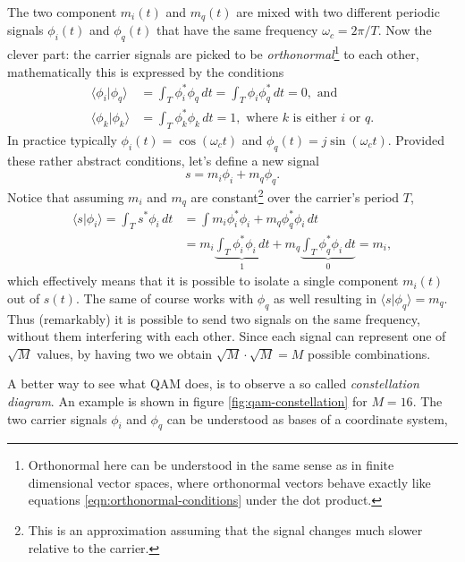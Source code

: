 The two component \(m_i(t)\) and \(m_q(t)\) are mixed with two different periodic signals \(\phi_i(t)\) and \(\phi_q(t)\) that have the same frequency \(\omega_c = 2\pi / T\). Now the clever part: the carrier signals are picked to be \emph{orthonormal}\footnote{Orthonormal here can be understood in the same sense as in finite dimensional vector spaces, where orthonormal vectors behave exactly like equations \eqref{eqn:orthonormal-conditions} under the dot product.} to each other, mathematically this is expressed by the conditions
\begin{subequations} \label{eqn:orthonormal-conditions}
	\begin{align}
		\langle \phi_i | \phi_q \rangle
			&= \int_T \phi_i^* \phi_q \, dt = \int_T \phi_i \phi_q^* \, dt
			= 0, \text{ and } \\
		\langle \phi_k | \phi_k \rangle
			&= \int_T \phi_k^* \phi_k \,dt = 1,
			\text{ where } k \text{ is either } i \text{ or } q.
	\end{align}
\end{subequations}
In practice typically \(\phi_i(t) = \cos(\omega_c t)\) and \(\phi_q(t) = j\sin(\omega_c t)\).  Provided these rather abstract conditions, let's define a new signal 
\begin{equation}
	s = m_i\phi_i + m_q\phi_q.
\end{equation}
Notice that assuming \(m_i\) and \(m_q\) are constant\footnote{This is an approximation assuming that the signal changes much slower relative to the carrier.} over the carrier's period \(T\),
\begin{align*}
	\langle s | \phi_i \rangle = \int_T s^* \phi_i \,dt
		&= \int m_i \phi_i^* \phi_i + m_q \phi_q^* \phi_i \,dt \\
		&= m_i \underbrace{\int_T \phi_i^* \phi_i \,dt}_{1}
			+ m_q \underbrace{\int_T \phi_q^* \phi_i \,dt}_{0} = m_i,
\end{align*}
which effectively means that it is possible to isolate a single component \(m_i(t)\) out of \(s(t)\). The same of course works with \(\phi_q\) as well resulting in \(\langle s | \phi_q \rangle = m_q\). Thus (remarkably) it is possible to send two signals on the same frequency, without them interfering with each other. Since each signal can represent one of \(\sqrt{M}\) values, by having two we obtain \(\sqrt{M} \cdot \sqrt{M} = M\) possible combinations.

A better way to see what QAM does, is to observe a so called \emph{constellation diagram}. An example is shown in figure \ref{fig:qam-constellation} for \(M = 16\). The two carrier signals \(\phi_i\) and \(\phi_q\) can be understood as bases of a coordinate system,


